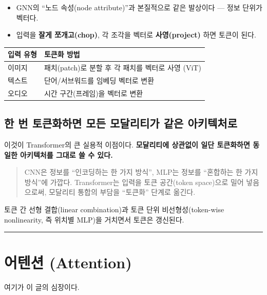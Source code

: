 \documentclass[
  korean,
]{article}
\newcounter{none} %
\providecommand{\tightlist}{%
  \setlength{\itemsep}{0pt}\setlength{\parskip}{0pt}}
\begin{document}
\begin{itemize}
\tightlist
\item
  GNN의 ``노드 속성(node attribute)''과 본질적으로 같은 발상이다 ---
  정보 단위가 벡터다.
\item
  입력을 \textbf{잘게 쪼개고(chop)}, 각 조각을 벡터로
  \textbf{사영(project)} 하면 토큰이 된다.
\end{itemize}

{\def\LTcaptype{none} %
\begin{longtable}[]{@{}ll@{}}
\toprule\noalign{}
입력 유형 & 토큰화 방법 \\
\midrule\noalign{}
\endhead
\bottomrule\noalign{}
\endlastfoot
이미지 & 패치(patch)로 분할 후 각 패치를 벡터로 사영 (ViT) \\
텍스트 & 단어/서브워드를 임베딩 벡터로 변환 \\
오디오 & 시간 구간(프레임)을 벡터로 변환 \\
\end{longtable}
}

\subsection{한 번 토큰화하면 모든 모달리티가 같은
아키텍처로}\label{uxd55c-uxbc88-uxd1a0uxd070uxd654uxd558uxba74-uxbaa8uxb4e0-uxbaa8uxb2ecuxb9acuxd2f0uxac00-uxac19uxc740-uxc544uxd0a4uxd14duxcc98uxb85c}

이것이 Transformer의 큰 실용적 이점이다. \textbf{모달리티에 상관없이
일단 토큰화하면 동일한 아키텍처를 그대로 쓸 수 있다.}

\begin{quote}
CNN은 정보를 ``인코딩하는 한 가지 방식'', MLP는 정보를 ``혼합하는 한
가지 방식''에 가깝다. Transformer는 입력을 토큰 공간(token space)으로
밀어 넣음으로써, 모달리티 통합의 부담을 ``토큰화'' 단계로 옮긴다.
\end{quote}

토큰 간 선형 결합(linear combination)과 토큰 단위 비선형성(token-wise
nonlinearity, 즉 위치별 MLP)을 거치면서 토큰은 갱신된다.

\begin{center}\rule{0.5\linewidth}{0.5pt}\end{center}

\section{어텐션 (Attention)}\label{sec-attention}

여기가 이 글의 심장이다.
\end{document}
